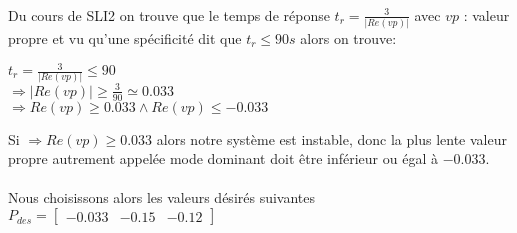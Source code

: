 		\paragraph{} Du cours de SLI2 on trouve que le temps de réponse $t_r =\frac{3}{|Re(vp)|} $ avec $vp$ : valeur propre et vu qu'une spécificité dit que $t_r \leqslant 90s$ alors on trouve:\\
		
		\begin{center}
				
				$t_r =\frac{3}{|Re(vp)|}\leqslant 90 $\\[1cm]
				$\Rightarrow|Re(vp)| \geqslant \frac{3}{90} \simeq 0.033 $\\[1cm]
				$\Rightarrow Re(vp) \geqslant 0.033 \wedge Re(vp) \leqslant -0.033$
		\end{center}
		Si $\Rightarrow Re(vp) \geqslant 0.033$ alors notre système est instable, donc la plus lente valeur propre autrement appelée mode dominant doit être inférieur ou égal à $-0.033$.\\\\
		Nous choisissons alors les valeurs désirés suivantes $P_{des}=\begin{bmatrix} -0.033&-0.15&-0.12 \end{bmatrix} $